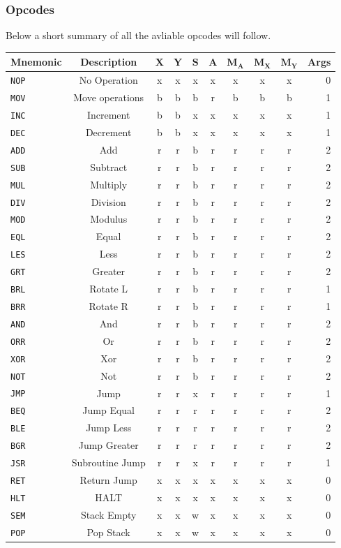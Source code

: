 \documentclass{article}
\newcommand{\V}{\verb}
\newcommand{\x}{$\textbf{X}$}
\newcommand{\y}{$\textbf{Y}$}
\newcommand{\s}{$\textbf{S}$}
\newcommand{\A}{$\textbf{A}$}
\newcommand{\mx}{$\textbf{M}_{\textbf{X}}$}
\newcommand{\my}{$\textbf{M}_{\textbf{Y}}$}
\newcommand{\ma}{$\textbf{M}_{\textbf{A}}$}
\begin{document}
\subsubsection{Opcodes}
Below a short summary of all the avliable opcodes will follow.\\
\begin{tabular}{l || c | *{7}{c|} | r}     
\textbf{Mnemonic} & \textbf{Description} & \x & \y& \s & \A &\ma & \mx & \my &
Args
\\
\hline
\V+NOP+ & No Operation & x & x & x & x & x & x & x & 0  \\ 
\hline
\V+MOV+ & Move operations & b & b & b & r & b & b & b & 1 \\
\hline
\V+INC+ & Increment& b & b & x & x & x & x & x & 1 \\
\V+DEC+ & Decrement	& b & b & x & x & x & x & x & 1 \\
\V+ADD+ & Add		& r & r & b & r & r & r & r & 2 \\
\V+SUB+ & Subtract	& r & r & b & r & r & r & r & 2 \\
\V+MUL+ & Multiply	& r & r & b & r & r & r & r & 2 \\
\V+DIV+ & Division	& r & r & b & r & r & r & r & 2 \\
\V+MOD+ & Modulus	& r & r & b & r & r & r & r & 2 \\
\hline
\V+EQL+ & Equal		& r & r & b & r & r & r & r & 2 \\
\V+LES+ & Less		& r & r & b & r & r & r & r & 2 \\
\V+GRT+ & Greater 	& r & r & b & r & r & r & r & 2 \\
\V+BRL+ & Rotate L	& r & r & b & r & r & r & r & 1 \\
\V+BRR+ & Rotate R	& r & r & b & r & r & r & r & 1 \\
\V+AND+ & And		& r & r & b & r & r & r & r & 2 \\
\V+ORR+ & Or 		& r & r & b & r & r & r & r & 2 \\
\V+XOR+ & Xor		& r & r & b & r & r & r & r & 2 \\
\V+NOT+ & Not		& r & r & b & r & r & r & r & 2 \\
\hline
\V+JMP+ & Jump		& r & r & x & r & r & r & r & 1 \\ 
\V+BEQ+ & Jump Equal& r & r & r & r & r & r & r & 2 \\
\V+BLE+ & Jump Less	& r & r & r & r & r & r & r & 2 \\
\V+BGR+ & Jump Greater& r & r & r & r & r & r & r & 2 \\
\V+JSR+ & Subroutine Jump& r & r & x & r & r & r & r & 1 \\
\V+RET+ & Return Jump& x & x & x & x & x & x & x & 0 \\
\hline
\V+HLT+ & HALT& x & x & x & x & x & x & x & 0 \\
\V+SEM+ & Stack Empty& x & x & w & x & x & x & x & 0 \\
\V+POP+ & Pop Stack& x & x & w & x & x & x & x & 0 \\
\end{tabular}
\end{document}
